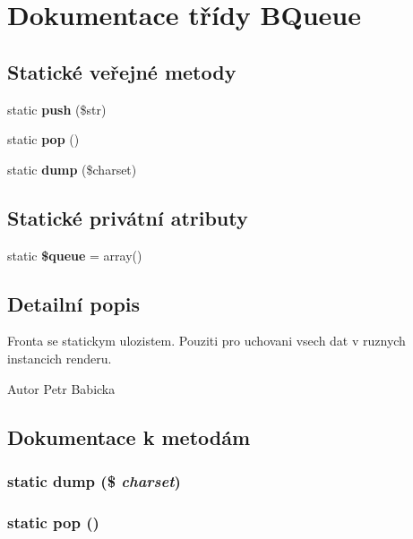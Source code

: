 \section{Dokumentace třídy BQueue}
\label{d0/d02/class_b_queue}
\subsection*{Statické veřejné metody}
\begin{DoxyCompactItemize}
\item 
static {\bf push} (\$str)
\item 
static {\bf pop} ()
\item 
static {\bf dump} (\$charset)
\end{DoxyCompactItemize}
\subsection*{Statické privátní atributy}
\begin{DoxyCompactItemize}
\item 
static {\bf \$queue} = array()
\end{DoxyCompactItemize}


\subsection{Detailní popis}
Fronta se statickym ulozistem. Pouziti pro uchovani vsech dat v ruznych instancich renderu. \begin{DoxyAuthor}{Autor}
Petr Babicka 
\end{DoxyAuthor}


\subsection{Dokumentace k metodám}
\subsubsection[{dump}]{\setlength{\rightskip}{0pt plus 5cm}static dump (\$ {\em charset})\hspace{0.3cm}{\ttfamily  [static]}}\label{d0/d02/class_b_queue_a480da52f3014b9fcc8ef4bcbc78a56f7}
\subsubsection[{pop}]{\setlength{\rightskip}{0pt plus 5cm}static pop ()\hspace{0.3cm}{\ttfamily  [static]}}\label{d0/d02/class_b_queue_afd8f881161bb8423dac2b69f9a6972dd}
